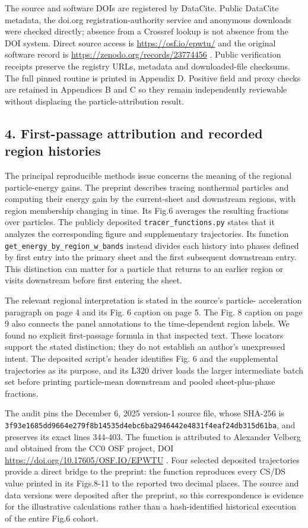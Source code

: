 The source and software DOIs are registered by DataCite. Public DataCite
metadata, the doi.org registration-authority service and anonymous
downloads were checked directly; absence from a Crossref lookup is not
absence from the DOI system. Direct source access is
\url{https://osf.io/epwtu/} and the original software record is
\url{https://zenodo.org/records/23774456} . Public verification receipts
preserve the registry URLs, metadata and downloaded-file checksums. The
full pinned routine is printed in Appendix D. Positive field and proxy
checks are retained in Appendices B and C so they remain independently
reviewable without displacing the particle-attribution result.

\FloatBarrier
\subsection{4. First-passage attribution and recorded region
histories}\label{first-passage-attribution-and-recorded-region-histories}

The principal reproducible methods issue concerns the meaning of the
regional particle-energy gains. The preprint describes tracing
nonthermal particles and computing their energy gain by the
current-sheet and downstream regions, with region membership changing in
time. Its Fig.6 averages the resulting fractions over particles. The
publicly deposited \nolinkurl{tracer_functions.py} states that it analyzes
the corresponding figure and supplementary trajectories. Its function
\nolinkurl{get_energy_by_region_w_bands} instead divides each history
into phases defined by first entry into the primary sheet and the first
subsequent downstream entry. This distinction can matter for a particle
that returns to an earlier region or visits downstream before first
entering the sheet.

The relevant regional interpretation is stated in the source's particle-
acceleration paragraph on page 4 and its Fig. 6 caption on page 5. The
Fig. 8 caption on page 9 also connects the panel annotations to the
time-dependent region labels. We found no explicit first-passage formula
in that inspected text. These locators support the stated distinction;
they do not establish an author's unexpressed intent. The deposited
script's header identifies Fig. 6 and the supplemental trajectories as
its purpose, and its L320 driver loads the larger intermediate batch set
before printing particle-mean downstream and pooled sheet-plus-phase
fractions.

The audit pins the December 6, 2025 version-1 source file, whose SHA-256
is
\nolinkurl{3f93e1685dd9664e279f8b14535d4ebc6ba2946442e4831f4eaf24db315d61ba},
and preserves its exact lines 344-403. The function is attributed to
Alexander Velberg and obtained from the CC0 OSF project, DOI
\url{https://doi.org/10.17605/OSF.IO/EPWTU} . Four selected deposited
trajectories provide a direct bridge to the preprint: the function
reproduces every CS/DS value printed in its Figs.8-11 to the reported
two decimal places. The source and data versions were deposited after
the preprint, so this correspondence is evidence for the illustrative
calculations rather than a hash-identified historical execution of the
entire Fig.6 cohort.

